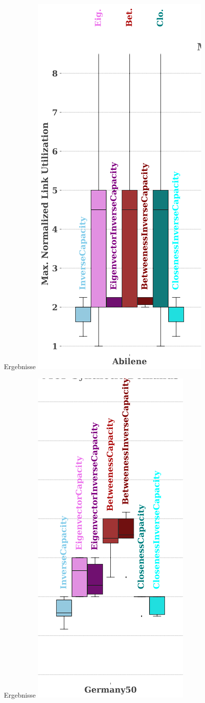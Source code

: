 \documentclass[aspectratio=169,10pt]{beamer}
\begin{document}
\begin{frame}[fragile]{Ergebnisse}
\includegraphics[width=.4\textwidth, angle=270]{images/kai_6.png}
\end{frame}
\begin{frame}[fragile]{Ergebnisse}
\includegraphics[width=.4\textwidth, angle=270]{images/kai_7.png}
\end{frame}
\end{document}
